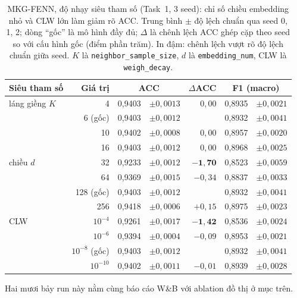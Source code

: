 \documentclass[conference]{IEEEtran}
\begin{document}
\begin{table}[t]
\caption{MKG-FENN, độ nhạy siêu tham số (Task~1, 3 seed): chỉ số chiều embedding nhỏ và CLW lớn làm giảm rõ ACC.
Trung bình ${\pm}$ độ lệch chuẩn qua seed 0, 1, 2; dòng ``gốc'' là mô hình đầy đủ; $\Delta$ là chênh lệch
ACC ghép cặp theo seed so với cấu hình gốc (điểm phần trăm). In đậm: chênh lệch vượt rõ độ lệch chuẩn
giữa seed. $K$ là \texttt{neighbor\_sample\_size}, $d$ là \texttt{embedding\_num}, CLW là \texttt{weigh\_decay}.}
\label{tab:fenn-sens}
\centering\footnotesize
\setlength{\tabcolsep}{2.5pt}
\begin{tabular}{lrr@{\,}lrr@{\,}l}
\toprule
Siêu tham số & Giá trị & \multicolumn{2}{c}{ACC} & $\Delta$ACC & \multicolumn{2}{c}{F1 (macro)} \\
\midrule
láng giềng $K$ & 4 & 0,9403 & ${\pm}0{,}0013$ & $0{,}00$ & 0,8935 & ${\pm}0{,}0021$ \\
 & 6 (gốc) & 0,9403 & ${\pm}0{,}0012$ & & 0,8932 & ${\pm}0{,}0041$ \\
 & 10 & 0,9402 & ${\pm}0{,}0008$ & $0{,}00$ & 0,8957 & ${\pm}0{,}0020$ \\
 & 16 & 0,9403 & ${\pm}0{,}0012$ & $0{,}00$ & 0,8968 & ${\pm}0{,}0025$ \\
\midrule
chiều $d$ & 32 & 0,9233 & ${\pm}0{,}0012$ & $\mathbf{-1{,}70}$ & 0,8523 & ${\pm}0{,}0059$ \\
 & 64 & 0,9369 & ${\pm}0{,}0015$ & $-0{,}34$ & 0,8837 & ${\pm}0{,}0033$ \\
 & 128 (gốc) & 0,9403 & ${\pm}0{,}0012$ & & 0,8932 & ${\pm}0{,}0041$ \\
 & 256 & 0,9418 & ${\pm}0{,}0006$ & $+0{,}15$ & 0,8975 & ${\pm}0{,}0023$ \\
\midrule
CLW & $10^{-4}$ & 0,9261 & ${\pm}0{,}0017$ & $\mathbf{-1{,}42}$ & 0,8536 & ${\pm}0{,}0024$ \\
 & $10^{-6}$ & 0,9394 & ${\pm}0{,}0004$ & $-0{,}09$ & 0,8953 & ${\pm}0{,}0021$ \\
 & $10^{-8}$ (gốc) & 0,9403 & ${\pm}0{,}0012$ & & 0,8932 & ${\pm}0{,}0041$ \\
 & $10^{-10}$ & 0,9402 & ${\pm}0{,}0011$ & $-0{,}01$ & 0,8939 & ${\pm}0{,}0028$ \\
\bottomrule
\end{tabular}
\end{table}

Hai mươi bảy run này nằm cùng báo cáo W\&B với ablation đồ thị ở mục trên.
\end{document}
